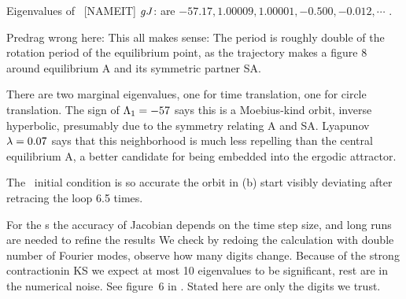 Eigenvalues of \rpo\ [NAMEIT] $g{J}$: are
$ -57.17,  1.00009, 1.00001, -0.500, -0.012, \cdots$ .
%

Predrag wrong here:
This all makes sense: The period is roughly double of the rotation period of
the equilibrium point, as the trajectory makes a figure 8 around equilibrium A and
its symmetric partner SA.

 There are two
marginal eigenvalues, one for time translation, one for
circle translation. 
The sign of $\Lambda_{1}=-57$ says this is a Moebius-kind orbit,
inverse hyperbolic, presumably due to the symmetry relating A and SA.
Lyapunov $\lambda=0.07$ says that this neighborhood is much less repelling than
the central equilibrium A, a better candidate for being embedded into the
ergodic attractor.

The \rpo\ initial condition is
so accurate the orbit in (b)
start visibly deviating after retracing the loop 6.5 times.

For the \rpo s the accuracy of Jacobian depends
on the time step size, and long runs are needed to refine the results
We check by redoing the calculation with double 
number of Fourier modes, observe how many digits
change. 
Because of the strong contractionin KS we expect at most 10 eigenvalues to be
significant, rest are in the numerical noise. See figure~6 in
.
Stated here are only the digits we trust.

